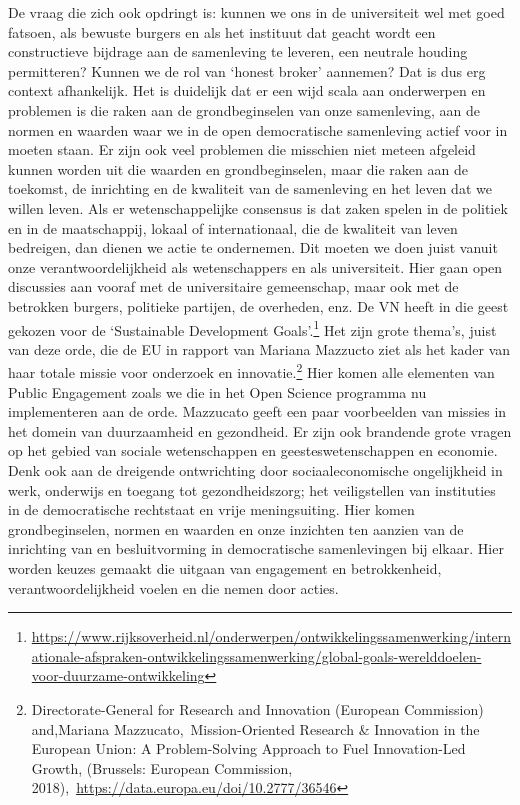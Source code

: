 \documentclass{jote-book}
\begin{document}
	De vraag die zich ook opdringt is: kunnen we ons in de universiteit wel met goed fatsoen, als bewuste burgers en als het instituut dat geacht wordt een constructieve bijdrage aan de samenleving te leveren, een neutrale houding permitteren? Kunnen we de rol van ‘honest broker' aannemen? Dat is dus erg context afhankelijk. Het is duidelijk dat er een wijd scala aan onderwerpen en problemen is die raken aan de grondbeginselen van onze samenleving, aan de normen en waarden waar we in de open democratische samenleving actief voor in moeten staan. Er zijn ook veel problemen die misschien niet meteen afgeleid kunnen worden uit die waarden en grondbeginselen, maar die raken aan de toekomst, de inrichting en de kwaliteit van de samenleving en het leven dat we willen leven. Als er wetenschappelijke consensus is dat zaken spelen in de politiek en in de maatschappij, lokaal of internationaal, die de kwaliteit van leven bedreigen, dan dienen we actie te ondernemen. Dit moeten we doen juist vanuit onze verantwoordelijkheid als wetenschappers en als universiteit. Hier gaan open discussies aan vooraf met de universitaire gemeenschap, maar ook met de betrokken burgers, politieke partijen, de overheden, enz. De VN heeft in die geest gekozen voor de ‘Sustainable Development Goals'.\footnote{\href{about:blank}{https://www.rijksoverheid.nl/onderwerpen/ontwikkelingssamenwerking/internationale-afspraken-ontwikkelingssamenwerking/global-goals-werelddoelen-voor-duurzame-ontwikkeling}} Het zijn grote thema's, juist van deze orde, die de EU in rapport van Mariana Mazzucto ziet als het kader van haar totale missie voor onderzoek en innovatie.\footnote{Directorate-General for Research and Innovation (European Commission) and,Mariana Mazzucato, Mission-Oriented Research \& Innovation in the European Union: A Problem-Solving Approach to Fuel Innovation-Led Growth, (Brussels: European Commission, 2018), \href{about:blank}{https://data.europa.eu/doi/10.2777/36546}} Hier komen alle elementen van Public Engagement zoals we die in het Open Science programma nu implementeren aan de orde. Mazzucato geeft een paar voorbeelden van missies in het domein van duurzaamheid en gezondheid. Er zijn ook brandende grote vragen op het gebied van sociale wetenschappen en geesteswetenschappen en economie. Denk ook aan de dreigende ontwrichting door sociaaleconomische ongelijkheid in werk, onderwijs en toegang tot gezondheidszorg; het veiligstellen van instituties in de democratische rechtstaat en vrije meningsuiting. Hier komen grondbeginselen, normen en waarden en onze inzichten ten aanzien van de inrichting van en besluitvorming in democratische samenlevingen bij elkaar. Hier worden keuzes gemaakt die uitgaan van engagement en betrokkenheid, verantwoordelijkheid voelen en die nemen door acties.
\end{document}
